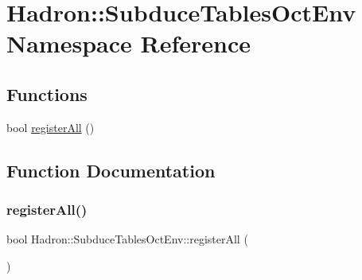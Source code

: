 \hypertarget{namespaceHadron_1_1SubduceTablesOctEnv}{}\section{Hadron\+:\+:Subduce\+Tables\+Oct\+Env Namespace Reference}
\label{namespaceHadron_1_1SubduceTablesOctEnv}
\subsection*{Functions}
\begin{DoxyCompactItemize}
\item 
bool \mbox{\hyperlink{namespaceHadron_1_1SubduceTablesOctEnv_a51ef987c89c5e4509cb7c7c24fb152d6}{register\+All}} ()
\end{DoxyCompactItemize}


\subsection{Function Documentation}
\mbox{\label{namespaceHadron_1_1SubduceTablesOctEnv_a51ef987c89c5e4509cb7c7c24fb152d6}} 
\subsubsection{\texorpdfstring{registerAll()}{registerAll()}}
{\footnotesize\ttfamily bool Hadron\+::\+Subduce\+Tables\+Oct\+Env\+::register\+All (\begin{DoxyParamCaption}{ }\end{DoxyParamCaption})}

